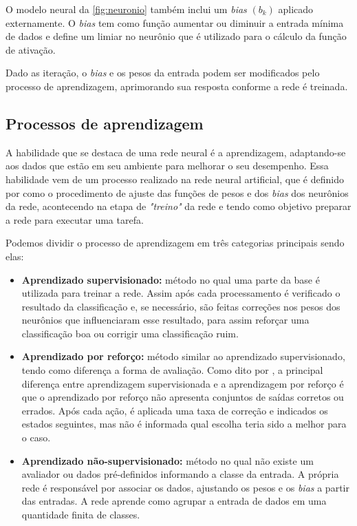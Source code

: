 \par O modelo neural da \autoref{fig:neuronio} também inclui um \textit{bias} $(b_k)$ aplicado externamente. O \textit{bias} tem como função aumentar ou diminuir a entrada mínima de dados e define um limiar no neurônio que é utilizado para o cálculo da função de ativação. 
\par Dado as iteração, o \textit{bias} e os pesos da entrada podem ser modificados pelo processo de aprendizagem, aprimorando sua resposta conforme a rede é treinada.  
\subsection{Processos de aprendizagem}
A habilidade que se destaca de uma rede neural é a aprendizagem, adaptando-se aos dados que estão em seu ambiente para melhorar o seu desempenho. Essa habilidade vem de um processo realizado na rede neural artificial, que é definido por  como o procedimento de ajuste das funções de pesos e dos \textit{bias} dos neurônios da rede, acontecendo na etapa de \textit{"treino"} da rede e tendo como objetivo preparar a rede para executar uma tarefa. 
\par Podemos dividir o processo de aprendizagem em três categorias principais sendo elas:
\begin{itemize}
\item \textbf{Aprendizado supervisionado:} método no qual uma parte da base é utilizada para treinar a rede. Assim após cada processamento é verificado o resultado da classificação e, se necessário, são feitas correções nos pesos dos neurônios que influenciaram esse resultado, para assim reforçar uma classificação boa ou corrigir uma classificação ruim.
\item \textbf{Aprendizado por reforço:} método similar ao aprendizado supervisionado, tendo como diferença a forma de avaliação. Como dito por , a principal diferença entre aprendizagem supervisionada e a aprendizagem por reforço é que o aprendizado por reforço não apresenta conjuntos de saídas corretos ou errados. Após cada ação, é aplicada uma taxa de correção e indicados os estados seguintes, mas não é informada qual escolha teria sido a melhor para o caso.
\item \textbf{Aprendizado não-supervisionado:} método no qual não existe um avaliador ou dados pré-definidos informando a classe da entrada. A própria rede é responsável por associar os dados, ajustando os pesos e os \textit{bias} a partir das entradas. A rede aprende como agrupar a entrada de dados em uma quantidade finita de classes. 
\end{itemize}	
